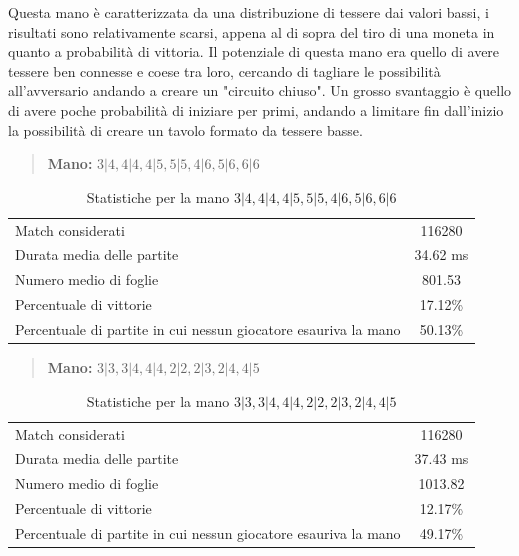 \documentclass[a4paper,12pt]{report}
\begin{document}
Questa mano è caratterizzata da una distribuzione di tessere dai valori bassi, i risultati sono relativamente scarsi, appena al di sopra del tiro di una moneta in quanto a probabilità di vittoria.
Il potenziale di questa mano era quello di avere tessere ben connesse e coese tra loro, cercando di tagliare le possibilità all'avversario andando a creare un "circuito chiuso".
Un grosso svantaggio è quello di avere poche probabilità di iniziare per primi, andando a limitare fin dall'inizio la possibilità di creare un tavolo formato da tessere basse.


\begin{quote}
    \textbf{Mano:} \(3|4, 4|4, 4|5, 5|5, 4|6, 5|6, 6|6\)
\end{quote}

\begin{table}[h!]
    \centering
    \begin{tabular}{|l|c|}
        \hline
        Match considerati & 116280 \\
        Durata media delle partite & 34.62 ms \\
        Numero medio di foglie & 801.53 \\
        Percentuale di vittorie & 17.12\% \\
        Percentuale di partite in cui nessun giocatore esauriva la mano & 50.13\% \\
        \hline
    \end{tabular}
    \caption{Statistiche per la mano \(3|4, 4|4, 4|5, 5|5, 4|6, 5|6, 6|6\)}
    \label{tab:stats_3}
\end{table}


\begin{quote}
    \textbf{Mano:} \(3|3, 3|4, 4|4, 2|2, 2|3, 2|4, 4|5\)
\end{quote}

\begin{table}[h!]
    \centering
    \begin{tabular}{|l|c|}
        \hline
        Match considerati & 116280 \\
        Durata media delle partite & 37.43 ms \\
        Numero medio di foglie & 1013.82 \\
        Percentuale di vittorie & 12.17\% \\
        Percentuale di partite in cui nessun giocatore esauriva la mano & 49.17\% \\
        \hline
    \end{tabular}
    \caption{Statistiche per la mano \(3|3, 3|4, 4|4, 2|2, 2|3, 2|4, 4|5\)}
    \label{tab:stats_4}
\end{table}
\end{document}
